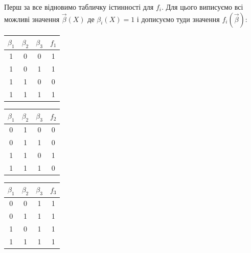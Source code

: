 \begin{solution}
    Перш за все відновимо табличку істинності для $f_i$. Для цього виписуємо всі можливі значення $\vec \beta(X)$ де $\beta_i(X) = 1$ і дописуємо туди значення $f_i(\vec \beta)$:
    
    \begin{table}[H]
        \centering
        \begin{tabular}[t]{|c|c|c|c|}
            \hline
            $\beta_1$ & $\beta_2$ & $\beta_3$ & $f_1$ \\ \hline
            1 & 0 & 0 & 1 \\
            1 & 0 & 1 & 1 \\
            1 & 1 & 0 & 0 \\
            1 & 1 & 1 & 1 \\ \hline
        \end{tabular}
        \hfill
        \begin{tabular}[t]{|c|c|c|c|}
            \hline
            $\beta_1$ & $\beta_2$ & $\beta_3$ & $f_2$ \\ \hline
            0 & 1 & 0 & 0 \\
            0 & 1 & 1 & 0 \\
            1 & 1 & 0 & 1 \\
            1 & 1 & 1 & 0 \\ \hline
        \end{tabular}
        \hfill
        \begin{tabular}[t]{|c|c|c|c|}
            \hline
            $\beta_1$ & $\beta_2$ & $\beta_3$ & $f_3$ \\ \hline
            0 & 0 & 1 & 1 \\
            0 & 1 & 1 & 1 \\
            1 & 0 & 1 & 1 \\
            1 & 1 & 1 & 1 \\ \hline
        \end{tabular}
    \end{table}
    

\end{solution}
